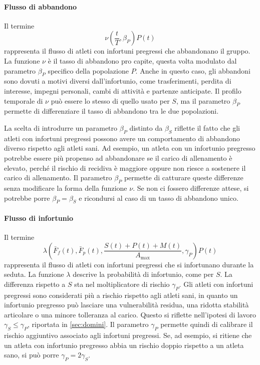 \paragraph{Flusso di abbandono}
Il termine
\[
    \nu\left(\frac{t}{T}, \beta_P\right) P(t)
\]
rappresenta il flusso di atleti con infortuni pregressi che abbandonano il gruppo. La funzione $\nu$ è il tasso di abbandono pro capite, questa volta modulato dal parametro $\beta_P$ specifico della popolazione $P$. Anche in questo caso, gli abbandoni sono dovuti a motivi diversi dall'infortunio, come trasferimenti, perdita di interesse, impegni personali, cambi di attività e partenze anticipate. Il profilo temporale di $\nu$ può essere lo stesso di quello usato per $S$, ma il parametro $\beta_P$ permette di differenziare il tasso di abbandono tra le due popolazioni. \par

La scelta di introdurre un parametro $\beta_P$ distinto da $\beta_S$ riflette il fatto che gli atleti con infortuni pregressi possono avere un comportamento di abbandono diverso rispetto agli atleti sani. Ad esempio, un atleta con un infortunio pregresso potrebbe essere più propenso ad abbandonare se il carico di allenamento è elevato, perché il rischio di recidiva è maggiore oppure non riesce a sostenere il carico di allenamento. Il parametro $\beta_P$ permette di catturare queste differenze senza modificare la forma della funzione $\nu$. Se non ci fossero differenze attese, si potrebbe porre $\beta_P = \beta_S$ e ricondursi al caso di un tasso di abbandono unico.

\paragraph{Flusso di infortunio}
Il termine
\[
    \lambda\left(\bar{F}_f(t), \bar{F}_p(t), \frac{S(t) + P(t) + M(t)}{A_{\max}}, \gamma_P\right) P(t)
\]
rappresenta il flusso di atleti con infortuni pregressi che si infortunano durante la seduta. La funzione $\lambda$ descrive la probabilità di infortunio, come per $S$. La differenza rispetto a $S$ sta nel moltiplicatore di rischio $\gamma_P$. Gli atleti con infortuni pregressi sono considerati più a rischio rispetto agli atleti sani, in quanto un infortunio pregresso può lasciare una vulnerabilità residua, una ridotta stabilità articolare o una minore tolleranza al carico. Questo si riflette nell'ipotesi di lavoro $\gamma_S \leq \gamma_P$, riportata in \autoref{sec:domini}. Il parametro $\gamma_P$ permette quindi di calibrare il rischio aggiuntivo associato agli infortuni pregressi. Se, ad esempio, si ritiene che un atleta con infortunio pregresso abbia un rischio doppio rispetto a un atleta sano, si può porre $\gamma_P = 2\gamma_S$. \par

